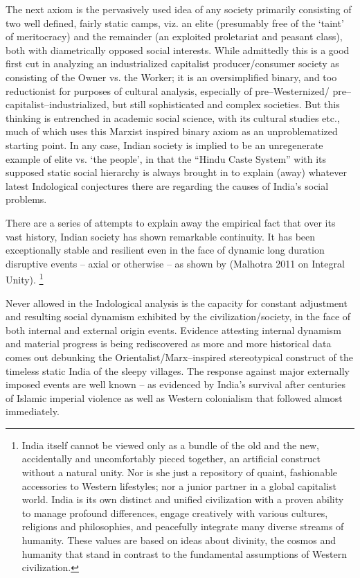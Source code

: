The next axiom is the pervasively used idea of any society primarily consisting of two well defined, fairly static camps, viz. an elite (presumably free of the ‘taint’ of meritocracy) and the remainder (an exploited proletariat and peasant class), both with diametrically opposed social interests. While admittedly this is a good first cut in analyzing an industrialized capitalist producer/consumer society as consisting of the Owner vs. the Worker; it is an oversimplified binary, and too reductionist for purposes of cultural analysis, especially of pre–Westernized/ pre–capitalist–industrialized, but still sophisticated and complex societies. But this thinking is entrenched in academic social science, with its cultural studies etc., much of which uses this Marxist inspired binary axiom as an unproblematized starting point. In any case, Indian society is implied to be an unregenerate example of elite vs. ‘the people’, in that the “Hindu Caste System” with its supposed static social hierarchy is always brought in to explain (away) whatever latest Indological conjectures there are regarding the causes of India’s social problems.

There are a series of attempts to explain away the empirical fact that over its vast history, Indian society has shown remarkable continuity. It has been exceptionally stable and resilient even in the face of dynamic long duration disruptive events – axial or otherwise – as shown by (Malhotra 2011 on Integral Unity). \footnote{ India itself cannot be viewed only as a bundle of the old and the new, accidentally and uncomfortably pieced together, an artificial construct without a natural unity. Nor is she just a repository of quaint, fashionable accessories to Western lifestyles; nor a junior partner in a global capitalist world. India is its own distinct and unified civilization with a proven ability to manage profound differences, engage creatively with various cultures, religions and philosophies, and peacefully integrate many diverse streams of humanity. These values are based on ideas about divinity, the cosmos and humanity that stand in contrast to the fundamental assumptions of Western civilization.}

Never allowed in the Indological analysis is the capacity for constant adjustment and resulting social dynamism exhibited by the civilization/society, in the face of both internal and external origin events. Evidence attesting internal dynamism and material progress is being rediscovered as more and more historical data comes out debunking the Orientalist/Marx–inspired stereotypical construct of the timeless static India of the sleepy villages. The response against major externally imposed events are well known – as evidenced by India’s survival after centuries of Islamic imperial violence as well as Western colonialism that followed almost immediately.



